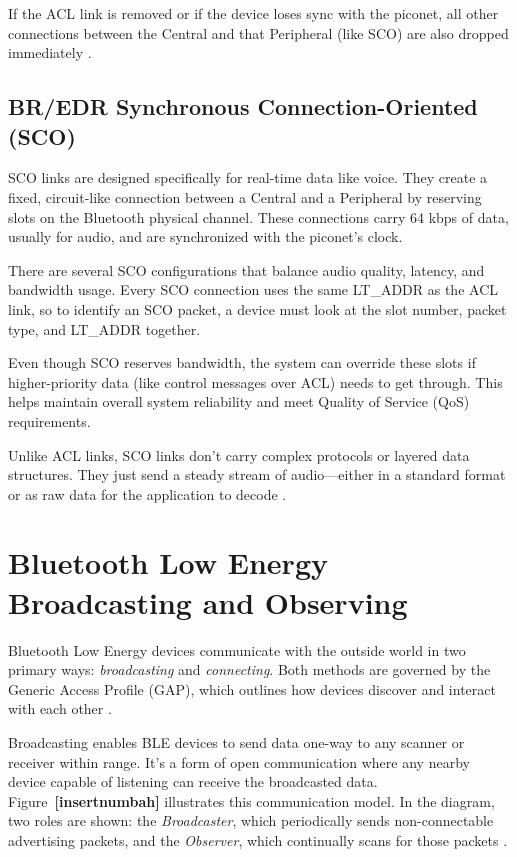 If the ACL link is removed or if the device loses sync with the piconet, all other connections between the Central and that Peripheral (like SCO) are also dropped immediately \cite{bluetoothcorespec6}.

\subsection{BR/EDR Synchronous Connection-Oriented (SCO)}

SCO links are designed specifically for real-time data like voice. They create a fixed, circuit-like connection between a Central and a Peripheral by reserving slots on the Bluetooth physical channel. These connections carry 64 kbps of data, usually for audio, and are synchronized with the piconet’s clock.

There are several SCO configurations that balance audio quality, latency, and bandwidth usage. Every SCO connection uses the same LT\_ADDR as the ACL link, so to identify an SCO packet, a device must look at the slot number, packet type, and LT\_ADDR together.

Even though SCO reserves bandwidth, the system can override these slots if higher-priority data (like control messages over ACL) needs to get through. This helps maintain overall system reliability and meet Quality of Service (QoS) requirements.

Unlike ACL links, SCO links don’t carry complex protocols or layered data structures. They just send a steady stream of audio—either in a standard format or as raw data for the application to decode \cite{bluetoothcorespec6}.

\section{Bluetooth Low Energy Broadcasting and Observing}

Bluetooth Low Energy devices communicate with the outside world in two primary ways: \textit{broadcasting} and \textit{connecting}. Both methods are governed by the Generic Access Profile (GAP), which outlines how devices discover and interact with each other \cite{gettingstartedwble}.

Broadcasting enables BLE devices to send data one-way to any scanner or receiver within range. It’s a form of open communication where any nearby device capable of listening can receive the broadcasted data. Figure~\textbf{[insertnumbah]} illustrates this communication model. In the diagram, two roles are shown: the \textit{Broadcaster}, which periodically sends non-connectable advertising packets, and the \textit{Observer}, which continually scans for those packets \cite{gettingstartedwble}.

